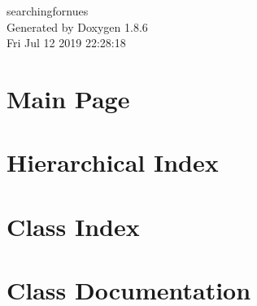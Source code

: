 \documentclass[twoside]{book}
\newcommand{\clearemptydoublepage}{%
  \newpage{\pagestyle{empty}\cleardoublepage}%
}
\begin{document}
\hypersetup{pageanchor=false}
\begin{titlepage}
\vspace*{7cm}
\begin{center}%
{\Large searchingfornues }\\
\vspace*{1cm}
{\large Generated by Doxygen 1.8.6}\\
\vspace*{0.5cm}
{\small Fri Jul 12 2019 22:28:18}\\
\end{center}
\end{titlepage}
\clearemptydoublepage
\tableofcontents
\clearemptydoublepage
{}
\hypersetup{pageanchor=true}

\chapter{Main Page}
\label{index}\hypertarget{index}{}
\chapter{Hierarchical Index}

\chapter{Class Index}

\chapter{Class Documentation}








































\newpage
{}
{}
\printindex
\end{document}
